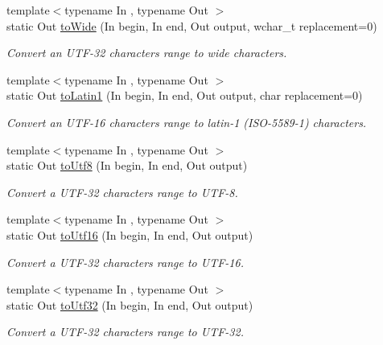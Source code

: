 \begin{DoxyCompactItemize}
{\footnotesize template$<$typename In , typename Out $>$ }\\static Out \hyperlink{classburn_1_1_utf_3_0132_01_4_afe5846f22f840bdb54794784b8901638}{to\-Wide} (In begin, In end, Out output, wchar\-\_\-t replacement=0)
\begin{DoxyCompactList}\small\item\em Convert an U\-T\-F-\/32 characters range to wide characters. \end{DoxyCompactList}\item 
{\footnotesize template$<$typename In , typename Out $>$ }\\static Out \hyperlink{classburn_1_1_utf_3_0132_01_4_ad54e5abb94b1f7f11cc9556067b702c8}{to\-Latin1} (In begin, In end, Out output, char replacement=0)
\begin{DoxyCompactList}\small\item\em Convert an U\-T\-F-\/16 characters range to latin-\/1 (I\-S\-O-\/5589-\/1) characters. \end{DoxyCompactList}\item 
{\footnotesize template$<$typename In , typename Out $>$ }\\static Out \hyperlink{classburn_1_1_utf_3_0132_01_4_a7f78010591449b38cd1547111c1a22a2}{to\-Utf8} (In begin, In end, Out output)
\begin{DoxyCompactList}\small\item\em Convert a U\-T\-F-\/32 characters range to U\-T\-F-\/8. \end{DoxyCompactList}\item 
{\footnotesize template$<$typename In , typename Out $>$ }\\static Out \hyperlink{classburn_1_1_utf_3_0132_01_4_ae76c256283519a795faf784c116f3881}{to\-Utf16} (In begin, In end, Out output)
\begin{DoxyCompactList}\small\item\em Convert a U\-T\-F-\/32 characters range to U\-T\-F-\/16. \end{DoxyCompactList}\item 
{\footnotesize template$<$typename In , typename Out $>$ }\\static Out \hyperlink{classburn_1_1_utf_3_0132_01_4_af2596c8c5bd7756f5e7746a4f0b36d61}{to\-Utf32} (In begin, In end, Out output)
\begin{DoxyCompactList}\small\item\em Convert a U\-T\-F-\/32 characters range to U\-T\-F-\/32. \end{DoxyCompactList}\item 

\end{DoxyCompactItemize}
